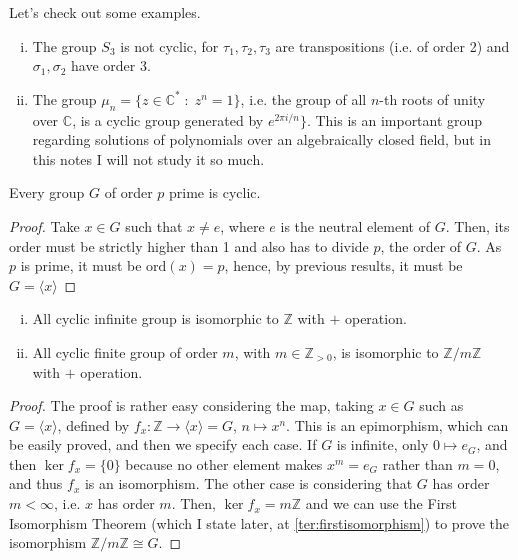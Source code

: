 \documentclass[../main.tex]{subfiles}
\begin{document}
\begin{ej}
Let's check out some examples. 
\begin{enumerate}[(i)]
    \item The group $S_3$ is not cyclic, for $\tau_1,\tau_2,\tau_3$ are transpositions (i.e. of order 2) and $\sigma_1,\sigma_2$ have order 3.
    \item The group $\mu_n = \{z\in\mathbb{C}^*\;:\;z^n = 1\}$, i.e. the group of all $n$-th roots of unity over $\mathbb{C}$, is a cyclic group generated by $e^{2\pi i/n}\}$. This is an important group regarding solutions of polynomials over an algebraically closed field, but in this notes I will not study it so much.
\end{enumerate}
\end{ej}

\begin{coro}
\label{coro:primeorderiscyclic} Every group $G$ of order $p$ prime is cyclic.
\end{coro}
\begin{proof}
Take $x\in G$ such that $x\not=e$, where $e$ is the neutral element of $G$. Then, its order must be strictly higher than 1 and also has to divide $p$, the order of $G$. As $p$ is prime, it must be $\mathrm{ord}(x) = p$, hence, by previous results, it must be $G = \langle x\rangle$
\end{proof}

\begin{prop}
\label{prop:cyclicintegers} 
\begin{enumerate}[(i)]
    \item All cyclic infinite group is isomorphic to $\mathbb{Z}$ with $+$ operation.
    \item All cyclic finite group of order $m$, with $m\in\mathbb{Z}_{>0}$, is isomorphic to $\mathbb{Z}/m\mathbb{Z}$ with $+$ operation.
\end{enumerate}
\end{prop}
\begin{proof}
The proof is rather easy considering the map, taking $x\in G$ such as $G = \langle x\rangle$, defined by $f_x:\mathbb{Z}\rightarrow \langle x \rangle =G$, $n\mapsto x^n$. This is an epimorphism, which can be easily proved, and then we specify each case. If $G$ is infinite, only $0\mapsto e_G$, and then $\ker f_x = \{0\}$ because no other element makes $x^m = e_G$ rather than $m = 0$, and thus $f_x$ is an isomorphism. The other case is considering that $G$ has order $m<\infty$, i.e. $x$ has order $m$. Then, $\ker f_x = m\mathbb{Z}$ and we can use the First Isomorphism Theorem (which I state later, at \ref{ter:firstisomorphism}) to prove the isomorphism $\mathbb{Z}/m\mathbb{Z}\cong G$.
\end{proof}
\end{document}
